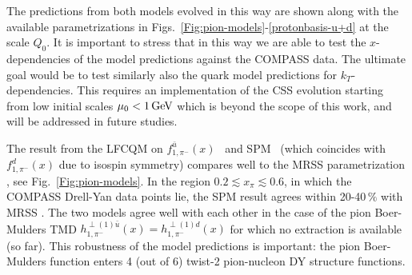\documentclass[a4paper]{article}
\begin{document}
The predictions from both models evolved in this way 
are shown along with the available parametrizations in
Figs.~\ref{Fig:pion-models}-\ref{protonbasis-u+d} at the scale $Q_0$. 
It is important to stress that in this way we are able to test the
$x$-dependencies of the model predictions against the COMPASS data. 
The ultimate goal would be to test similarly also the quark model 
predictions for $k_T$-dependencies. This requires an implementation of 
the CSS evolution starting from low initial scales $\mu_0< 1\,{\rm GeV}$
which is beyond the scope of this work, and will be addressed in future studies.

The result from the LFCQM on $f_{1,\pi^-}^{\bar u}(x)$~\cite{Pasquini:2014ppa}
and SPM~\cite{Gamberg:2009uk}
(which coincides with 
$f_{1,\pi^-}^{d}(x)$ due to isospin symmetry) compares well 
to the MRSS parametrization \cite{Martin:2009iq},
see Fig.~\ref{Fig:pion-models}.
In the region $0.2\lesssim x_\pi \lesssim 0.6$,
in which the COMPASS Drell-Yan data points lie, 
the SPM result agrees within 20-40$\,\%$ with MRSS \cite{Martin:2009iq}.
The two models agree well with each other 
in the case of the pion Boer-Mulders TMD 
$h_{1,\pi^-}^{\perp(1) \bar u}(x)=h_{1,\pi^-}^{\perp(1) d}(x)$
for which no extraction is available (so far). 
This robustness of the model predictions is important: the pion Boer-Mulders
function enters 4 (out of 6) twist-2 pion-nucleon DY structure functions.
\end{document}

